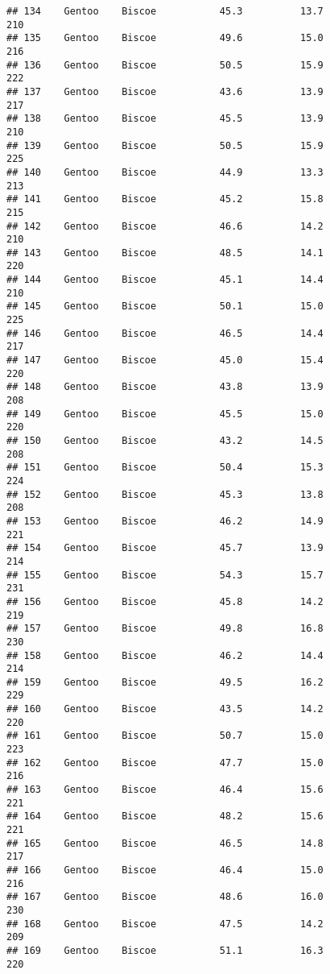 \documentclass[
]{article}
\begin{document}
\begin{verbatim}
## 134    Gentoo    Biscoe           45.3          13.7               210
## 135    Gentoo    Biscoe           49.6          15.0               216
## 136    Gentoo    Biscoe           50.5          15.9               222
## 137    Gentoo    Biscoe           43.6          13.9               217
## 138    Gentoo    Biscoe           45.5          13.9               210
## 139    Gentoo    Biscoe           50.5          15.9               225
## 140    Gentoo    Biscoe           44.9          13.3               213
## 141    Gentoo    Biscoe           45.2          15.8               215
## 142    Gentoo    Biscoe           46.6          14.2               210
## 143    Gentoo    Biscoe           48.5          14.1               220
## 144    Gentoo    Biscoe           45.1          14.4               210
## 145    Gentoo    Biscoe           50.1          15.0               225
## 146    Gentoo    Biscoe           46.5          14.4               217
## 147    Gentoo    Biscoe           45.0          15.4               220
## 148    Gentoo    Biscoe           43.8          13.9               208
## 149    Gentoo    Biscoe           45.5          15.0               220
## 150    Gentoo    Biscoe           43.2          14.5               208
## 151    Gentoo    Biscoe           50.4          15.3               224
## 152    Gentoo    Biscoe           45.3          13.8               208
## 153    Gentoo    Biscoe           46.2          14.9               221
## 154    Gentoo    Biscoe           45.7          13.9               214
## 155    Gentoo    Biscoe           54.3          15.7               231
## 156    Gentoo    Biscoe           45.8          14.2               219
## 157    Gentoo    Biscoe           49.8          16.8               230
## 158    Gentoo    Biscoe           46.2          14.4               214
## 159    Gentoo    Biscoe           49.5          16.2               229
## 160    Gentoo    Biscoe           43.5          14.2               220
## 161    Gentoo    Biscoe           50.7          15.0               223
## 162    Gentoo    Biscoe           47.7          15.0               216
## 163    Gentoo    Biscoe           46.4          15.6               221
## 164    Gentoo    Biscoe           48.2          15.6               221
## 165    Gentoo    Biscoe           46.5          14.8               217
## 166    Gentoo    Biscoe           46.4          15.0               216
## 167    Gentoo    Biscoe           48.6          16.0               230
## 168    Gentoo    Biscoe           47.5          14.2               209
## 169    Gentoo    Biscoe           51.1          16.3               220

\end{verbatim}
\end{document}
